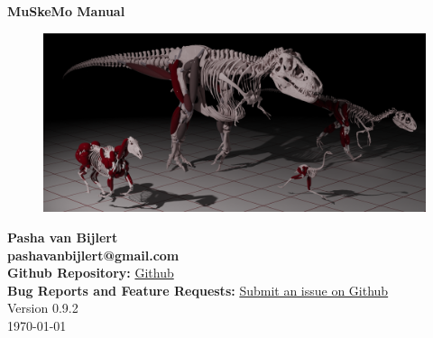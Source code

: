 \documentclass{article}
\begin{document}












\begin{center}
    {\huge \textbf{MuSkeMo Manual}}\\[20pt]  %
    \vspace{10pt}  %

    \begin{figure}[h]
        \centering
        \includegraphics[width=\textwidth]{figures/cover_pic.png} %
    \end{figure}
    \setcounter{figure}{0}
    \vspace{20pt} %
    
    {\Large \textbf{Pasha van Bijlert}}\\
    \vspace{10pt}
    \textbf{pashavanbijlert@gmail.com}\\
    \textbf{Github Repository:} \href{https://github.com/PashavanBijlert/MuSkeMo}{Github} \\
    \textbf{Bug Reports and Feature Requests:} \href{https://github.com/PashavanBijlert/MuSkeMo/issues}{Submit an issue on Github} \\
    \vspace{20pt}
    {\large Version 0.9.2} \\
    {\large \today}
\end{center}
\end{document}
